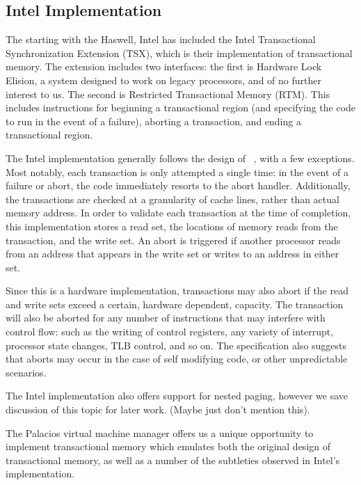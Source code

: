 \documentclass{acm_proc_article-sp}
\begin{document}
\subsection{Intel Implementation}

The starting with the Haswell, Intel has included the Intel Transactional
Synchronization Extension (TSX), which is their implementation of transactional
memory. The extension includes two interfaces: the first is Hardware Lock
Elision, a system designed to work on legacy processors, and of no further
interest to us. The second is Restricted Transactional Memory (RTM). This 
includes instructions for beginning a transactional region (and specifying the
code to run in the event of a failure), aborting a transaction, and ending a 
transactional region. \cite{intelsys, intelblog}

The Intel implementation generally follows the design of 
~\cite{Herlihy:1993:TMA:173682.165164}, with a few exceptions.
Most notably, each transaction is only attempted a single time: in the event
of a failure or abort, the code immediately resorts to the abort handler. 
Additionally, the transactions are checked at a granularity of cache lines, 
rather than actual memory address. In order to validate each transaction at the
time of completion, this implementation stores a read set, the locations of
memory reads from the transaction, and the write set. An abort is triggered
if another processor reads from an address that appears in the write set or 
writes to an address in either set.

Since this is a hardware implementation, transactions may also abort if the 
read and write sets exceed a certain, hardware dependent, capacity. The 
transaction will also be aborted for any number of instructions that may 
interfere with control flow: such as the writing of control registers, any 
variety of interrupt, processor state changes, TLB control, and so on. The 
specification also suggests that aborts may occur in the case of self modifying
code, or other unpredictable scenarios.

The Intel implementation also offers support for nested paging, however we
save discussion of this topic for later work. (Maybe just don't mention this). 

The Palacios virtual machine manager offers us a unique opportunity to
implement transactional memory which emulates both the original design of
transactional memory, as well as a number of the subtleties observed in 
Intel's implementation.
\end{document}
